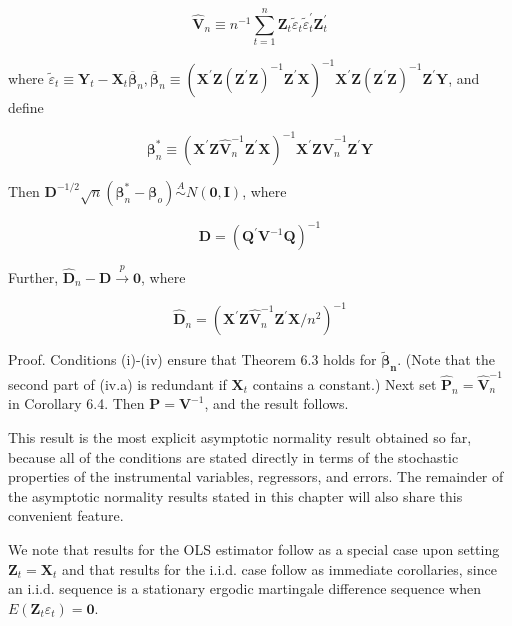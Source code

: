 \documentclass[10pt]{article}
\begin{document}
$$
\hat{\mathbf{V}}_{n} \equiv n^{-1} \sum_{t=1}^{n} \mathbf{Z}_{t} \tilde{\varepsilon}_{t} \tilde{\varepsilon}_{t}^{\prime} \mathbf{Z}_{t}^{\prime}
$$

where $\tilde{\varepsilon}_{t} \equiv \mathbf{Y}_{t}-\mathbf{X}_{t} \overline{\boldsymbol{\beta}}_{n}, \overline{\boldsymbol{\beta}}_{n} \equiv\left(\mathbf{X}^{\prime} \mathbf{Z}\left(\mathbf{Z}^{\prime} \mathbf{Z}\right)^{-1} \mathbf{Z}^{\prime} \mathbf{X}\right)^{-1} \mathbf{X}^{\prime} \mathbf{Z}\left(\mathbf{Z}^{\prime} \mathbf{Z}\right)^{-1} \mathbf{Z}^{\prime} \mathbf{Y}$, and define

$$
\boldsymbol{\beta}_{n}^{*} \equiv\left(\mathbf{X}^{\prime} \mathbf{Z} \hat{\mathbf{V}}_{n}^{-1} \mathbf{Z}^{\prime} \mathbf{X}\right)^{-1} \mathbf{X}^{\prime} \mathbf{Z} \hat{\mathbf{V}}_{n}^{-1} \mathbf{Z}^{\prime} \mathbf{Y}
$$

Then $\mathbf{D}^{-1 / 2} \sqrt{n}\left(\boldsymbol{\beta}_{n}^{*}-\boldsymbol{\beta}_{o}\right) \stackrel{A}{\sim} N(\mathbf{0}, \mathbf{I})$, where

$$
\mathbf{D}=\left(\mathbf{Q}^{\prime} \mathbf{V}^{-1} \mathbf{Q}\right)^{-1}
$$

Further, $\hat{\mathbf{D}}_{n}-\mathbf{D} \xrightarrow{p} \mathbf{0}$, where

$$
\hat{\mathbf{D}}_{n}=\left(\mathbf{X}^{\prime} \mathbf{Z} \hat{\mathbf{V}}_{n}^{-1} \mathbf{Z}^{\prime} \mathbf{X} / n^{2}\right)^{-1}
$$

Proof. Conditions (i)-(iv) ensure that Theorem 6.3 holds for $\tilde{\boldsymbol{\beta}}_{\boldsymbol{n}}$. (Note that the second part of (iv.a) is redundant if $\mathbf{X}_{t}$ contains a constant.) Next set $\hat{\mathbf{P}}_{n}=\hat{\mathbf{V}}_{n}^{-1}$ in Corollary 6.4. Then $\mathbf{P}=\mathbf{V}^{-1}$, and the result follows.

This result is the most explicit asymptotic normality result obtained so far, because all of the conditions are stated directly in terms of the stochastic properties of the instrumental variables, regressors, and errors. The remainder of the asymptotic normality results stated in this chapter will also share this convenient feature.

We note that results for the OLS estimator follow as a special case upon setting $\mathbf{Z}_{t}=\mathbf{X}_{t}$ and that results for the i.i.d. case follow as immediate corollaries, since an i.i.d. sequence is a stationary ergodic martingale difference sequence when $E\left(\mathbf{Z}_{t} \varepsilon_{t}\right)=\mathbf{0}$.
\end{document}
